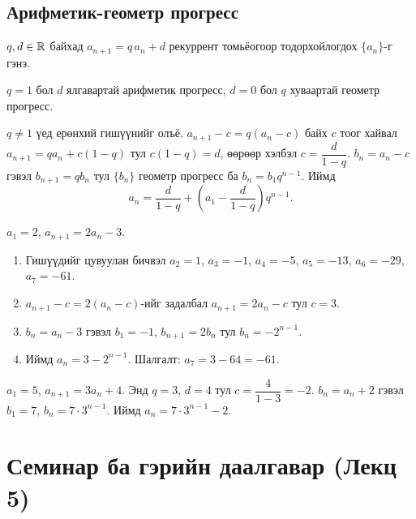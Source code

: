 \subsection{Арифметик-геометр прогресс}
\begin{definition}
$q,d\in\mathbb{R}$ байхад $a_{n+1}=q\,a_n+d$ рекуррент томьёогоор тодорхойлогдох $\{a_n\}$-г
 гэнэ.
\end{definition}

\begin{remark}
$q=1$ бол $d$ ялгавартай арифметик прогресс, $d=0$ бол $q$ хуваартай геометр прогресс.
\end{remark}

$q\neq1$ үед ерөнхий гишүүнийг олъё. $a_{n+1}-c=q(a_n-c)$ байх $c$ тоог хайвал
$a_{n+1}=qa_n+c(1-q)$ тул $c(1-q)=d$, өөрөөр хэлбэл $c=\dfrac{d}{1-q}$.
$b_n=a_n-c$ гэвэл $b_{n+1}=qb_n$ тул $\{b_n\}$ геометр прогресс ба $b_n=b_1q^{n-1}$. Иймд
\[
\boxed{a_n=\frac{d}{1-q}+\left(a_1-\frac{d}{1-q}\right)q^{n-1}.}
\]

\begin{example}
$a_1=2$, $a_{n+1}=2a_n-3$.
\begin{enumerate}
  \item Гишүүдийг цувуулан бичвэл $a_2=1$, $a_3=-1$, $a_4=-5$, $a_5=-13$, $a_6=-29$, $a_7=-61$.
  \item $a_{n+1}-c=2(a_n-c)$-ийг задалбал $a_{n+1}=2a_n-c$ тул $c=3$.
  \item $b_n=a_n-3$ гэвэл $b_1=-1$, $b_{n+1}=2b_n$ тул $b_n=-2^{n-1}$.
  \item Иймд $\boxed{a_n=3-2^{n-1}}$. \; Шалгалт: $a_7=3-64=-61$. \checkmark
\end{enumerate}
\end{example}

\begin{example}
$a_1=5$, $a_{n+1}=3a_n+4$. Энд $q=3$, $d=4$ тул $c=\dfrac{4}{1-3}=-2$.
$b_n=a_n+2$ гэвэл $b_1=7$, $b_n=7\cdot3^{n-1}$. Иймд $\boxed{a_n=7\cdot3^{n-1}-2.}$
\end{example}

\section{Семинар ба гэрийн даалгавар (Лекц 5)}


